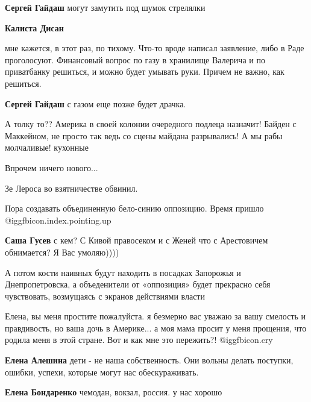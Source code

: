 \begin{itemize}
\begin{itemize}
\textbf{Сергей Гайдаш} могут замутить под шумок стрелялки

\textbf{Калиста Дисан} 

мне кажется, в этот раз, по тихому. Что-то вроде написал заявление, либо в Раде
проголосуют. Финансовый вопрос по газу в хранилище Валерича и по приватбанку
решиться, и можно будет умывать руки. Причем не важно, как решиться.

\textbf{Сергей Гайдаш} с газом еще позже будет драчка.

\end{itemize} %


А толку то?? Америка в своей колонии очередного подлеца назначит! Байден с
Маккейном, не просто так ведь со сцены майдана разрывались! А мы рабы
молчаливые! кухонные

Впрочем ничего нового...

Зе Лероса во взятничестве обвинил.

Пора создавать объединенную бело-синию оппозицию. Время пришло @igg{fbicon.index.pointing.up}

\begin{itemize} %
\textbf{Саша Гусев} с кем? С Кивой правосеком и с Женей что с Арестовичем обнимается?
Я Вас умоляю))))


А потом кости наивных будут находить в посадках Запорожья и Днепропетровска, а
объеденители от «оппозиция» будет прекрасно себя чувствовать, возмущаясь с
экранов действиями власти

\end{itemize} %


Елена, вы меня простите пожалуйста. я безмерно вас уважаю за вашу смелость и
правдивость, но ваша дочь в Америке... а моя мама просит у меня прощения, что
родила меня в этой стране. Вот и как мне это пережить?! @igg{fbicon.cry} 

\begin{itemize} %
\textbf{Елена Алешина} дети - не наша собственность. Они вольны делать поступки, ошибки, успехи, которые могут нас обескураживать.

\textbf{Елена Бондаренко} чемодан, вокзал, россия. у нас хорошо


\end{itemize}
\end{itemize}
